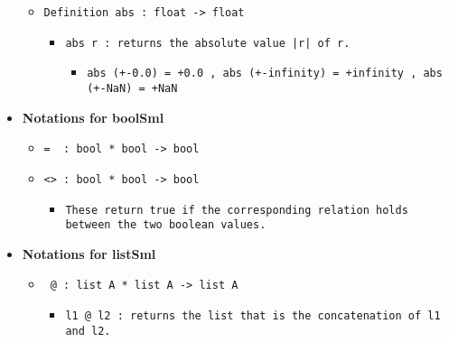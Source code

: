 \documentclass[11pt]{report}
\begin{document}
\begin{itemize}
\begin{itemize}
\begin{itemize}
\end{itemize}
\coqdocemptyline
\coqdocemptyline

\item \texttt{Definition abs : float -> float}

\begin{itemize}
\item  \texttt{abs r : returns the absolute value |r| of r.}

\begin{itemize}
\item  \begin{flushleft}\texttt{abs (+-0.0) = +0.0 , abs (+-infinity) = +infinity , abs (+-NaN) = +NaN} \end{flushleft}
\end{itemize}

\end{itemize}

\end{itemize}
\coqdocemptyline
\coqdocemptyline

\item  \textbf{Notations for boolSml}

\begin{itemize}
\item \texttt{= \ : bool * bool -> bool}

\item  \texttt{<> : bool * bool -> bool}

\begin{itemize}
\item \begin{flushleft} \texttt{These return true if the corresponding relation holds between the two boolean values.} \end{flushleft}

\end{itemize}

\end{itemize}

\item \textbf{ Notations for listSml}

\begin{itemize}
\item  \texttt{ @ : list A * list A -> list A}

\begin{itemize}
\item  \texttt{l1 @ l2 : returns the list that is the concatenation of l1 and l2.}

\end{itemize}

\end{itemize}

\end{itemize}
\begin{coqdoccode}
\coqdocemptyline
\end{coqdoccode}
\end{document}
